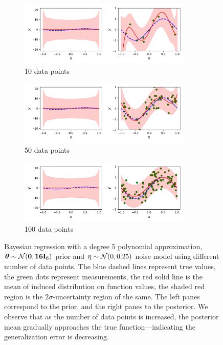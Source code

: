 \begin{figure}
  \begin{subfigure}{\textwidth}
    \includegraphics[width=0.9\textwidth]{../figures/bayesian_regression_1.pdf}
    \caption{10 data points}
  \end{subfigure}

  \begin{subfigure}{\textwidth}
    \includegraphics[width=0.9\textwidth]{../figures/bayesian_regression_2.pdf}
    \caption{50 data points}
  \end{subfigure}

  \begin{subfigure}{\textwidth}
    \includegraphics[width=0.9\textwidth]{../figures/bayesian_regression_3.pdf}
    \caption{100 data points}
  \end{subfigure}

  \caption{Bayesian regression with a degree 5 polynomial approximation,
  $\bm{\theta} \sim \mathcal{N}(\bm{0}, \bm{16} \mathbf{I}_6)$ prior and $\eta
  \sim \mathcal{N}(0, 0.25)$ noise model using different number of data points.
  The blue dashed lines represent true values, the green dots represent
  measurements, the red solid line is the mean of induced distribution on
  function values, the shaded red region is the $2\sigma$-uncertainty region of
  the same. The left panes correspond to the prior, and the right panes to the
  posterior. We observe that as the number of data points is increased, the
  posterior mean gradually approaches the true function---indicating the
  generalization error is decreasing.}
  \label{fig:regression}
\end{figure}

